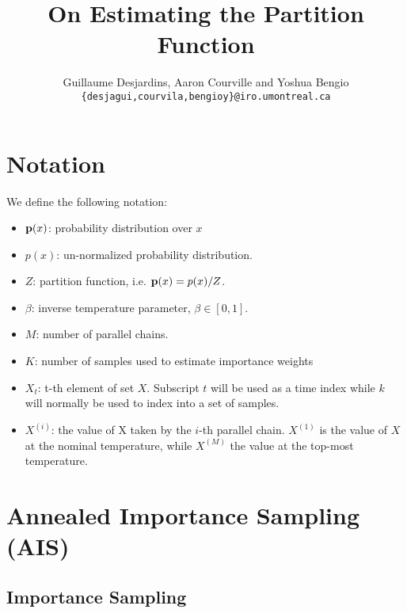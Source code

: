 \documentclass{article}
\begin{document}
\def\Ex{\mathbb{E}}
\def\E{\mathbf{E}}
\def\F{\mathbf{\mathcal{F}}}
\def\x{\mathbf{x}}
\def\h{\mathbf{h}}
\def\v{\mathbf{v}}
\def\nv{\mathbf{v^{{\bf -}}}}
\def\nh{\mathbf{h^{{\bf -}}}}
\def\b{\mathbf{b}}
\def\c{\mathbf{c}}
\def\W{\mathbf{W}}
\def\C{\mathbf{C}}
\def\P{\mathbf{P}}
\def\T{{\bf \mathcal T}}
\def\B{{\bf \mathcal B}}

\title{On Estimating the Partition Function}
\author{
Guillaume Desjardins, Aaron Courville and Yoshua Bengio\\
\texttt{\{desjagui,courvila,bengioy\}@iro.umontreal.ca}
}
\maketitle

\section{Notation}

We define the following notation:

\begin{itemize}
    \item ${\bf p}(x)$: probability distribution over $x$
    \item $p(x)$: un-normalized probability distribution.
    \item $Z$: partition function, i.e. ${\bf p}(x)= p(x) / Z$.
    \item $\beta$: inverse temperature parameter, $\beta \in [0,1]$.
    \item $M$: number of parallel chains.
    \item $K$: number of samples used to estimate importance weights
    \item $X_t$: t-th element of set $X$. Subscript $t$ will be used as a time index
          while $k$ will normally be used to index into a set of samples.
    \item $X^{(i)}$: the value of X taken by the $i$-th parallel chain.
          $X^{(1)}$ is the value of $X$ at the nominal temperature, while
          $X^{(M)}$ the value at the top-most temperature.
\end{itemize}

\section{Annealed Importance Sampling (AIS)}

\subsection{Importance Sampling}
\label{sec:importance}
\def\s{\mathbf{s}}
\def\q{\mathbf{q}}
\def\p{\mathbf{p}}
\end{document}
